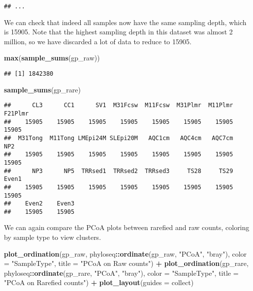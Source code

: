 \documentclass[
]{book}
\newenvironment{Shaded}{\begin{snugshade}}{\end{snugshade}}
\newcommand{\DataTypeTok}[1]{\textcolor[rgb]{0.13,0.29,0.53}{#1}}
\newcommand{\KeywordTok}[1]{\textcolor[rgb]{0.13,0.29,0.53}{\textbf{#1}}}
\newcommand{\NormalTok}[1]{#1}
\newcommand{\OperatorTok}[1]{\textcolor[rgb]{0.81,0.36,0.00}{\textbf{#1}}}
\newcommand{\StringTok}[1]{\textcolor[rgb]{0.31,0.60,0.02}{#1}}
\begin{document}
\begin{verbatim}
## ...
\end{verbatim}

We can check that indeed all samples now have the same sampling depth, which is 15905. Note that the highest sampling depth in this dataset was almost 2 million, so we have discarded a lot of data to reduce to 15905.

\begin{Shaded}
\begin{Highlighting}[]
\KeywordTok{max}\NormalTok{(}\KeywordTok{sample\_sums}\NormalTok{(gp\_raw))}
\end{Highlighting}
\end{Shaded}

\begin{verbatim}
## [1] 1842380
\end{verbatim}

\begin{Shaded}
\begin{Highlighting}[]
\KeywordTok{sample\_sums}\NormalTok{(gp\_rare)}
\end{Highlighting}
\end{Shaded}

\begin{verbatim}
##      CL3      CC1      SV1  M31Fcsw  M11Fcsw  M31Plmr  M11Plmr  F21Plmr 
##    15905    15905    15905    15905    15905    15905    15905    15905 
##  M31Tong  M11Tong LMEpi24M SLEpi20M   AQC1cm   AQC4cm   AQC7cm      NP2 
##    15905    15905    15905    15905    15905    15905    15905    15905 
##      NP3      NP5  TRRsed1  TRRsed2  TRRsed3     TS28     TS29    Even1 
##    15905    15905    15905    15905    15905    15905    15905    15905 
##    Even2    Even3 
##    15905    15905
\end{verbatim}

We can again compare the PCoA plots between rarefied and raw counts, coloring by sample type to view clusters.

\begin{Shaded}
\begin{Highlighting}[]
\KeywordTok{plot\_ordination}\NormalTok{(gp\_raw,}
\NormalTok{                phyloseq}\OperatorTok{::}\KeywordTok{ordinate}\NormalTok{(gp\_raw, }\StringTok{"PCoA"}\NormalTok{, }\StringTok{"bray"}\NormalTok{),}
                \DataTypeTok{color =} \StringTok{"SampleType"}\NormalTok{, }
                \DataTypeTok{title =} \StringTok{"PCoA on Raw counts"}\NormalTok{) }\OperatorTok{+}
\KeywordTok{plot\_ordination}\NormalTok{(gp\_rare,}
\NormalTok{                phyloseq}\OperatorTok{::}\KeywordTok{ordinate}\NormalTok{(gp\_rare, }\StringTok{"PCoA"}\NormalTok{, }\StringTok{"bray"}\NormalTok{),}
                \DataTypeTok{color =} \StringTok{"SampleType"}\NormalTok{, }
                \DataTypeTok{title =} \StringTok{"PCoA on Rarefied counts"}\NormalTok{) }\OperatorTok{+}
\StringTok{  }\KeywordTok{plot\_layout}\NormalTok{(}\DataTypeTok{guides =} \StringTok{\textquotesingle{}collect\textquotesingle{}}\NormalTok{)}
\end{Highlighting}
\end{Shaded}
\end{document}
